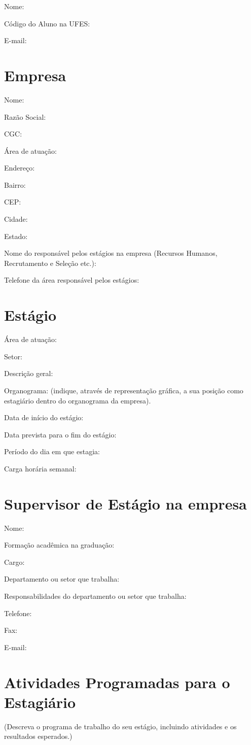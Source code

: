 \documentclass[
	12pt,				%
	openright,			%
	oneside,			%
	a4paper,			%
	english,			%
	french,				%
	spanish,			%
	brazil				%
	]{abntex2}
\begin{document}
Nome:\imprimirautor

Código do Aluno na UFES:

E-mail:

\section{Empresa}
Nome:

Razão Social:

CGC:

Área de atuação:

Endereço:

Bairro:

CEP:

Cidade:

Estado:

Nome do responsável pelos estágios na empresa (Recursos Humanos, Recrutamento e Seleção etc.):

Telefone da área responsável pelos estágios:

\section{Estágio}
Área de atuação:

Setor:

Descrição geral:

Organograma: (indique, através de representação gráfica, a sua posição como estagiário dentro do organograma da empresa).

Data de início do estágio:

Data prevista para o fim do estágio:

Período do dia em que estagia:

Carga horária semanal:
\section{Supervisor de Estágio na empresa}
Nome:

Formação acadêmica na graduação:

Cargo:

Departamento ou setor que trabalha:

Responsabilidades do departamento ou setor que trabalha:

Telefone:

Fax:

E-mail:

\section{Atividades Programadas para o Estagiário}
(Descreva o programa de trabalho do seu estágio, incluindo atividades e os resultados esperados.)
\end{document}
